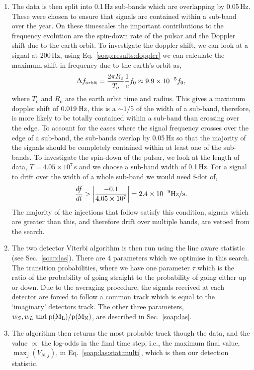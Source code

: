 \begin{enumerate}
\item The data is then split into 0.1\,Hz sub-bands which are overlapping by 0.05\,Hz. These were chosen to ensure that signals are contained within a sub-band over the year. On these timescales the important contributions to the frequency evolution are the spin-down rate of the pulsar and the Doppler shift due to the earth orbit.
To investigate the doppler shift, we can look at a signal at 200\,Hz, using Eq.~\ref{soap:results:doppler} we can calculate the maximum shift in frequency due to the earth's orbit as,
%
\begin{equation}
\label{soap:results:dforbit}
\Delta f_{\rm orbit} = \frac{2 \pi R_o}{T_o} \frac{1}{c} f_0 \approx 9.9 \times 10^{-5} f_0,
\end{equation}
%
where $T_{\text{o}}$ and $R_{\text{o}}$ are the
earth orbit time and radius. This gives a maximum doppler shift of $0.019 \; \rm{Hz}$, this is a $\sim 1/5$ of the width of a sub-band, therefore, is more likely to be totally contained within a sub-band than crossing over the edge.
To account for the cases where the signal frequency crosses over the edge of a sub-band, the sub-bands overlap by 0.05\,Hz so that the majority of the signals should be completely contained within at least one of the sub-bands.
To investigate the spin-down of the pulsar, we look at the length of data, $T=4.05 \times 10^7$\,s and we choose a sub-band width of 0.1\,Hz. For a signal to drift over the width of a whole sub-band we would need f-dot of,
\begin{equation}
\frac{df}{dt} > \left|\frac{-0.1}{4.05 \times 10^7}\right| = 2.4 \times 10^{-9} \rm{Hz/s}.
\end{equation}
The majority of the injections that follow satisfy this condition, signals which are greater than this, and therefore drift over multiple bands, are vetoed from the search.
%
\item The two detector Viterbi algorithm is then run using the line aware
statistic (see Sec.~\ref{soap:las}). There are 4 parameters which we optimise in this search. The transition probabilities, where we have one parameter $\tau$ which is the ratio of the probability
of going straight to the probability of going either up or down. Due to the averaging
procedure, the signals received at each detector are forced to follow a common track which is equal to the `imaginary' detectors track. The other three parameters, $w_S, w_L \; \rm{and} \; p(M_L)/p(M_N)$, are described in Sec.~\ref{soap:las}.
%
\item The algorithm then returns the most probable track though the data, and the value
$\propto$ the log-odds in the final time step, i.e., the
maximum final value, $\max_j(V_{N,j})$, in Eq.~\ref{soap:las:stat:multi}, which is then our detection statistic.

%
\end{enumerate}
